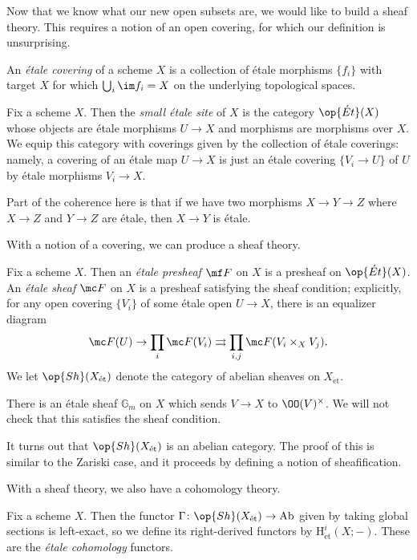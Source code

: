 \documentclass[../notes.tex]{subfiles}
\begin{document}
Now that we know what our new open subsets are, we would like to build a sheaf theory. This requires a notion of an open covering, for which our definition is unsurprising.
\begin{defihelper}
	An \textit{\'etale covering} of a scheme $X$ is a collection of \'etale morphisms $\{f_i\}$ with target $X$ for which $\bigcup_i\im f_i=X$ on the underlying topological spaces.
\end{defihelper}
\begin{definition}
	Fix a scheme $X$. Then the \textit{small \'etale site} of $X$ is the category $\op{\acute Et}(X)$ whose objects are \'etale morphisms $U\to X$ and morphisms are morphisms over $X$. We equip this category with coverings given by the collection of \'etale coverings: namely, a covering of an \'etale map $U\to X$ is just an \'etale covering $\{V_i\to U\}$ of $U$ by \'etale morphisms $V_i\to X$.
\end{definition}
\begin{remark}
	Part of the coherence here is that if we have two morphisms $X\to Y\to Z$ where $X\to Z$ and $Y\to Z$ are \'etale, then $X\to Y$ is \'etale.
\end{remark}
With a notion of a covering, we can produce a sheaf theory.
\begin{defihelper} 
	Fix a scheme $X$. Then an \textit{\'etale presheaf} $\mf F$ on $X$ is a presheaf on $\op{\acute Et}(X)$. An \textit{\'etale sheaf} $\mc F$ on $X$ is a presheaf satisfying the sheaf condition; explicitly, for any open covering $\{V_i\}$ of some \'etale open $U\to X$, there is an equalizer diagram
	\[\mc F(U)\to\prod_i\mc F(V_i)\rightrightarrows\prod_{i,j}\mc F(V_i\times_XV_j).\]
	We let $\op{Sh}(X_{\mathrm{\acute et}})$ denote the category of abelian sheaves on $X_{\mathrm{\acute et}}$.
\end{defihelper}
\begin{example}
	There is an \'etale sheaf $\mathbb G_m$ on $X$ which sends $V\to X$ to $\OO(V)^\times$. We will not check that this satisfies the sheaf condition.
\end{example}
\begin{remark}
	It turns out that $\op{Sh}(X_{\mathrm{\acute et}})$ is an abelian category. The proof of this is similar to the Zariski case, and it proceeds by defining a notion of sheafification.
\end{remark}
With a sheaf theory, we also have a cohomology theory.
\begin{defihelper}
	Fix a scheme $X$. Then the functor $\Gamma\colon\op{Sh}(X_{\mathrm{\acute et}})\to\mathrm{Ab}$ given by taking global sections is left-exact, so we define its right-derived functors by $\mathrm H^i_{\mathrm{\acute et}}(X;-)$. These are the \textit{\'etale cohomology} functors.
\end{defihelper}
\end{document}
